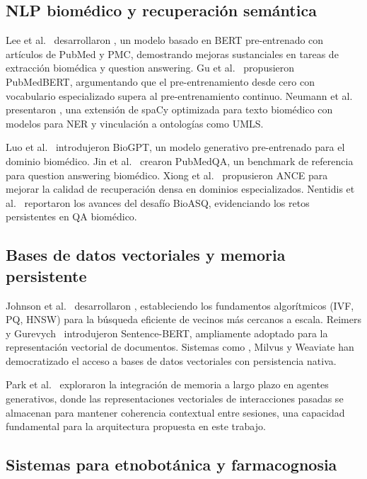 \subsection{NLP biomédico y recuperación semántica}
\label{subsec:rw_bionlp}

Lee et al.~\cite{lee2020biobert} desarrollaron \biobert{}, un modelo basado en BERT pre-entrenado con artículos de PubMed y PMC, demostrando mejoras sustanciales en tareas de extracción biomédica y question answering. Gu et al.~\cite{gu2021domain} propusieron PubMedBERT, argumentando que el pre-entrenamiento desde cero con vocabulario especializado supera al pre-entrenamiento continuo. Neumann et al.~\cite{neumann2019scispacy} presentaron \scispacy{}, una extensión de spaCy optimizada para texto biomédico con modelos para NER y vinculación a ontologías como UMLS.

Luo et al.~\cite{luo2022biogpt} introdujeron BioGPT, un modelo generativo pre-entrenado para el dominio biomédico. Jin et al.~\cite{jin2019pubmedqa} crearon PubMedQA, un benchmark de referencia para question answering biomédico. Xiong et al.~\cite{xiong2021approximate} propusieron ANCE para mejorar la calidad de recuperación densa en dominios especializados. Nentidis et al.~\cite{nentidis2023overview} reportaron los avances del desafío BioASQ, evidenciando los retos persistentes en QA biomédico.

\subsection{Bases de datos vectoriales y memoria persistente}
\label{subsec:rw_vectordb}

Johnson et al.~\cite{johnson2021billion} desarrollaron \faiss{}, estableciendo los fundamentos algorítmicos (IVF, PQ, HNSW) para la búsqueda eficiente de vecinos más cercanos a escala. Reimers y Gurevych~\cite{reimers2019sentence} introdujeron Sentence-BERT, ampliamente adoptado para la representación vectorial de documentos. Sistemas como \chromadb{}, Milvus y Weaviate han democratizado el acceso a bases de datos vectoriales con persistencia nativa.

Park et al.~\cite{park2023generative} exploraron la integración de memoria a largo plazo en agentes generativos, donde las representaciones vectoriales de interacciones pasadas se almacenan para mantener coherencia contextual entre sesiones, una capacidad fundamental para la arquitectura propuesta en este trabajo.

\subsection{Sistemas para etnobotánica y farmacognosia}
\label{subsec:rw_ethnobotany}

